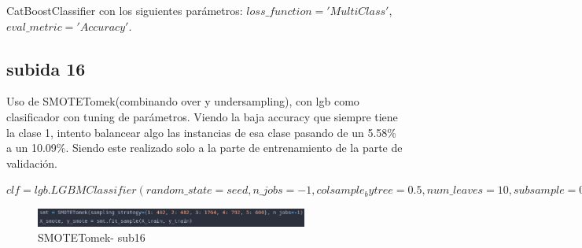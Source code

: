 CatBoostClassifier con los siguientes parámetros: $loss\_function='MultiClass'$, $eval\_metric='Accuracy'$.

\subsection{subida 16}

Uso de SMOTETomek(combinando over y undersampling), con lgb como clasificador con tuning de parámetros. Viendo la baja accuracy que siempre tiene la clase 1, intento balancear algo las instancias de esa clase pasando de un 5.58\% a un 10.09\%. Siendo este realizado solo a la parte de entrenamiento de la parte de validación.

$clf=lgb.LGBMClassifier(random\_state=seed, n\_jobs=-1, colsample_bytree=0.5,num\_leaves=10, subsample=0.5)$

\begin{figure}[H]
\centering
\includegraphics[width=0.8\textwidth]{imagenes/sub16-tomek.png}
\caption{SMOTETomek- sub16}
\end{figure}

